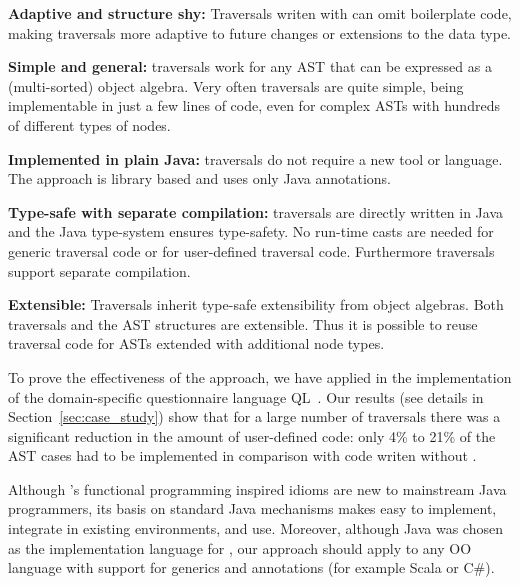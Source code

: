 \begin{itemize*}

\item {\bf Adaptive and structure shy:}  Traversals writen with \name can omit
  boilerplate code, making traversals more adaptive to
  future changes or extensions to the data type.

\item {\bf Simple and general:} \name traversals work for any
  AST that can be expressed as a (multi-sorted) object
  algebra. Very often traversals are quite simple, being
  implementable in just a few lines of code, even for complex
  ASTs with hundreds of different types of nodes.

\item {\bf Implemented in plain Java:} \name traversals do not require
  a new tool or language. The approach is library based and uses only
  Java annotations.

\item {\bf Type-safe with separate compilation:} \name traversals are directly written in Java
  and the Java type-system ensures type-safety. No run-time casts are
  needed for generic traversal code or for user-defined traversal
  code. Furthermore \name traversals support separate compilation.

\item {\bf Extensible:} Traversals inherit type-safe
  extensibility from object algebras. Both traversals and the AST structures
  are extensible. Thus it is possible to
  reuse traversal code for ASTs extended with additional
  node types.


\end{itemize*}

To prove the effectiveness of the approach, we have applied \name in
the implementation of the domain-specific questionnaire language
QL~\cite{gouseti14extensible}.  Our results (see details in
Section~\ref{sec:case_study}) show that for a large number of traversals there was a
significant reduction in the amount of user-defined code: only 4\% to
21\% of the AST cases had to be implemented in comparison with code
writen without \name.

Although \name's functional programming inspired idioms are new to
mainstream Java programmers, its basis on standard Java 
mechanisms makes \name easy to implement, integrate in existing
environments, and use.  Moreover, although Java was chosen as the
implementation language for \Name, our approach should apply to any OO
language with support for generics and annotations (for example Scala or C\#).

